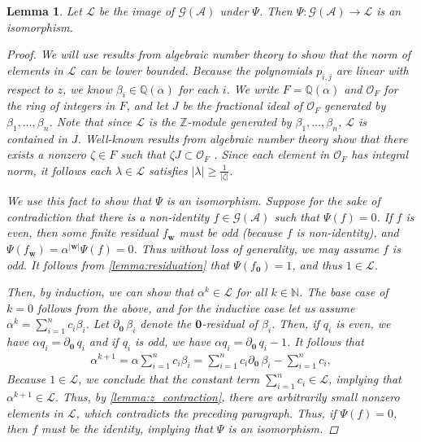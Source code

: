 \documentclass[12pt, letterpaper]{article}
\newcommand{\Z}{\mathbb Z}
\newcommand{\N}{\mathbb N}
\newcommand{\Q}{\mathbb Q}
\newcommand{\A}{\mathcal A}
\newcommand{\ch}[1]{\mathbf{#1}}
\newcommand{\res}[2]{{{#1}_{\ch{#2}}}}
\newcommand{\gp}{\mathcal G}
\newtheorem{lemma}[thm]{Lemma}
\begin{document}
\begin{lemma}\label{lemma:solution_faithful}
    Let $\mathcal L$ be the image of $\gp(\A)$ under $\Psi$. Then
    $\Psi : \gp(\A) \rightarrow \mathcal L$ is an isomorphism.
    \begin{proof}
        We will use results from algebraic number theory to show that the norm
        of elements in $\mathcal L$ can be lower bounded. Because the
        polynomials $p_{i,j}$ are linear with respect to $z$, we know $\beta_i
        \in \Q(\alpha)$ for each $i$. We write $F = \Q(\alpha)$ and $\mathcal
        O_F$ for the ring of integers in $F$, and let $J$ be the fractional
        ideal of $\mathcal O_F$ generated by $\beta_1, \ldots, \beta_n$. Note
        that since $\mathcal L$ is the $\Z$-module generated by $\beta_1,
        \ldots, \beta_n$, $\mathcal L$ is contained in $J$.  Well-known results
        from algebraic number theory show that there exists a nonzero $\zeta
        \in F$ such that $\zeta J \subset \mathcal O_F$
        \cite{stein2012algebraic}. Since each element in $\mathcal O_F$ has
        integral norm, it follows each $\lambda \in \mathcal L$ satisfies
        $|\lambda| \ge \frac{1}{|\zeta|}$.

        We use this fact to show that $\Psi$ is an isomorphism. Suppose for the
        sake of contradiction that there is a non-identity $f \in \gp(\A)$ such
        that $\Psi(f) = 0$. If $f$ is even, then some finite residual
        $\res{f}{w}$ must be odd (because $f$ is non-identity), and
        $\Psi(\res{f}{w}) = \alpha^{|\ch{w}|} \Psi(f) = 0$.  Thus without loss
        of generality, we may assume $f$ is odd. It follows from
        \cref{lemma:residuation} that $\Psi(\res{f}{0}) = 1$, and thus $1 \in
        \mathcal L$.

        \newcommand{\resz}[1]{\partial_{\ch{0}}\,#1}

        Then, by induction, we can show that $\alpha^k \in \mathcal L$ for all
        $k \in \N$. The base case of $k = 0$ follows from the above, and for
        the inductive case let us assume $\alpha^k = \sum_{i = 1}^n c_i
        \beta_i$. Let $\resz{\beta_i}$ denote the $\ch{0}$-residual
        of $\beta_i$.  Then, if $q_i$ is even, we have $\alpha q_i =
        \resz{q_i}$ and if $q_i$ is odd, we have $\alpha q_i =
        \resz{q_i} - 1$. It follows that
        \begin{align*}
            \alpha^{k+1} = \alpha \sum_{i = 1}^n c_i \beta_i =
            \sum_{i = 1}^n c_i \resz{\beta_i} - \sum_{i = 1}^n c_i,
        \end{align*}
        Because $1 \in \mathcal L$, we conclude that the constant
        term $\sum_{i = 1}^n c_i \in \mathcal L$, implying that $\alpha^{k+1}
        \in \mathcal L$. Thus, by \cref{lemma:z_contraction}, there are
        arbitrarily small nonzero elements in $\mathcal L$, which contradicts
        the preceding paragraph.  Thus, if $\Psi(f) = 0$, then $f$ must be the
        identity, implying that $\Psi$ is an isomorphism.
    \end{proof}
\end{lemma}
\end{document}
